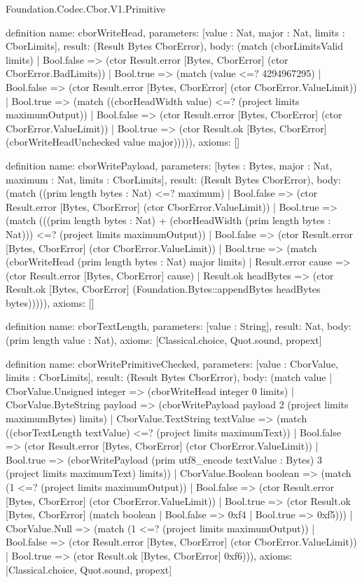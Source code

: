 \begin{lexlean}{Foundation.Codec.Cbor.V1.Primitive}
\begin{semanticmodule}
definition{
  name: cborWriteHead,
  parameters: [value : Nat, major : Nat, limits : CborLimits],
  result: (Result Bytes CborError),
  body: (match (cborLimitsValid limits)
    | Bool.false => (ctor Result.error [Bytes, CborError] (ctor CborError.BadLimits))
    | Bool.true => (match (value <=? 4294967295)
      | Bool.false => (ctor Result.error [Bytes, CborError] (ctor CborError.ValueLimit))
      | Bool.true => (match ((cborHeadWidth value) <=? (project limits maximumOutput))
        | Bool.false => (ctor Result.error [Bytes, CborError] (ctor CborError.ValueLimit))
        | Bool.true => (ctor Result.ok [Bytes, CborError] (cborWriteHeadUnchecked value major))))),
  axioms: []
}

definition{
  name: cborWritePayload,
  parameters: [bytes : Bytes, major : Nat, maximum : Nat, limits : CborLimits],
  result: (Result Bytes CborError),
  body: (match ((prim length bytes : Nat) <=? maximum)
    | Bool.false => (ctor Result.error [Bytes, CborError] (ctor CborError.ValueLimit))
    | Bool.true => (match (((prim length bytes : Nat) + (cborHeadWidth (prim length bytes : Nat))) <=? (project limits maximumOutput))
      | Bool.false => (ctor Result.error [Bytes, CborError] (ctor CborError.ValueLimit))
      | Bool.true => (match (cborWriteHead (prim length bytes : Nat) major limits)
        | Result.error cause => (ctor Result.error [Bytes, CborError] cause)
        | Result.ok headBytes => (ctor Result.ok [Bytes, CborError] (Foundation.Bytes::appendBytes headBytes bytes))))),
  axioms: []
}

definition{
  name: cborTextLength,
  parameters: [value : String],
  result: Nat,
  body: (prim length value : Nat),
  axioms: [Classical.choice, Quot.sound, propext]
}

definition{
  name: cborWritePrimitiveChecked,
  parameters: [value : CborValue, limits : CborLimits],
  result: (Result Bytes CborError),
  body: (match value
    | CborValue.Unsigned integer => (cborWriteHead integer 0 limits)
    | CborValue.ByteString payload => (cborWritePayload payload 2 (project limits maximumBytes) limits)
    | CborValue.TextString textValue => (match ((cborTextLength textValue) <=? (project limits maximumText))
      | Bool.false => (ctor Result.error [Bytes, CborError] (ctor CborError.ValueLimit))
      | Bool.true => (cborWritePayload (prim utf8_encode textValue : Bytes) 3 (project limits maximumText) limits))
    | CborValue.Boolean boolean => (match (1 <=? (project limits maximumOutput))
      | Bool.false => (ctor Result.error [Bytes, CborError] (ctor CborError.ValueLimit))
      | Bool.true => (ctor Result.ok [Bytes, CborError] (match boolean
        | Bool.false => 0xf4
        | Bool.true => 0xf5)))
    | CborValue.Null => (match (1 <=? (project limits maximumOutput))
      | Bool.false => (ctor Result.error [Bytes, CborError] (ctor CborError.ValueLimit))
      | Bool.true => (ctor Result.ok [Bytes, CborError] 0xf6))),
  axioms: [Classical.choice, Quot.sound, propext]
}


\end{semanticmodule}
\end{lexlean}

